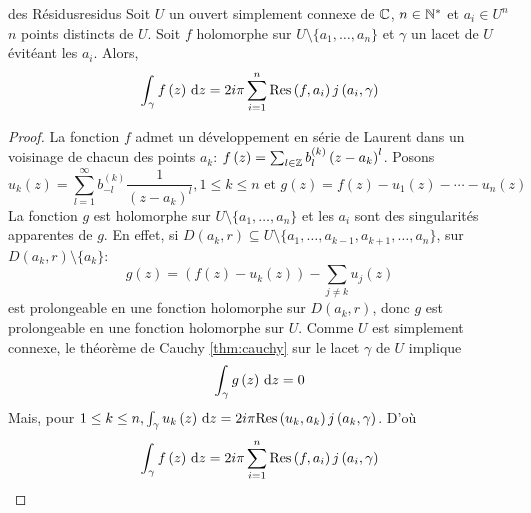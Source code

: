 \documentclass{cours}
\begin{document}
\begin{théorème}
	{des Résidus}{residus}
	Soit $U$ un ouvert simplement connexe de $\mathbb{C}$, $n \in \mathbb{N}^{*}$ et $a_{i} \in U^{n}$ $n$ points distincts de $U$.
	Soit $f$ holomorphe sur $U \setminus \{a_{1}, \ldots, a_{n}\}$ et $\gamma$ un lacet de $U$ évitéant les $a_{i}$.
	Alors, 
	\begin{equation*}
		\int_{\gamma} f\left(z\right){\rm \, d} z = 2i\pi \sum_{i = 1}^{n} \mathrm{Res}\left(f, a_{i}\right)j\left(a_{i}, \gamma\right)
	\end{equation*}
\end{théorème}
\begin{proof}
	La fonction $f$ admet un développement en série de Laurent dans un voisinage de chacun des points $a_{k}$: $f\left(z\right) = \sum_{l \in \mathbb{Z}}b_{l}^{\left(k\right)}\left(z - a_{k}\right)^{l}$. Posons
	\begin{equation*}
		u_{k}\left(z\right) = \sum_{l = 1}^{\infty}b_{- l}^{\left(k\right)}\frac{1}{\left(z - a_{k}\right)^{l}}, 1 \leq k \leq n 
		\text{ et } g\left(z\right) = f\left(z\right) - u_{1}\left(z\right) - \cdots - u_{n}\left(z\right)
	\end{equation*}
	La fonction $g$ est holomorphe sur $U \setminus \{a_{1}, \ldots, a_{n}\}$ et les $a_{i}$ sont des singularités apparentes de $g$.
	En effet, si $D\left(a_{k}, r\right) \subseteq U\setminus \{a_{1}, \ldots, a_{k - 1}, a_{k + 1}, \ldots, a_{n}\}$, sur $D\left(a_{k}, r\right) \setminus \{a_{k}\}$:
	\begin{equation*}
		g\left(z\right) = \left(f\left(z\right) - u_{k}\left(z\right)\right) - \sum_{j \neq k} u_{j}\left(z\right)
	\end{equation*}
	est prolongeable en une fonction holomorphe sur $D\left(a_{k}, r\right)$, donc $g$ est prolongeable en une fonction holomorphe sur $U$. 
	Comme $U$ est simplement connexe, le théorème de Cauchy \ref{thm:cauchy} sur le lacet $\gamma$ de $U$ implique \begin{equation*}
		\int_{\gamma}g\left(z\right) {\rm \, d} z = 0
	\end{equation*}
	Mais, pour $1 \leq k \leq n, \int_{\gamma}u_{k}\left(z\right){\rm \, d} z = 2i\pi \mathrm{Res}\left(u_{k}, a_{k}\right)j\left(a_{k}, \gamma\right)$. D'où
	\begin{equation*}
		\int_{\gamma}f\left(z\right) {\rm \, d} z = 2i\pi\sum_{i = 1}^{n}\mathrm{Res}\left(f, a_{i}\right)j\left(a_{i}, \gamma\right)
	\end{equation*}
\end{proof}
\end{document}
